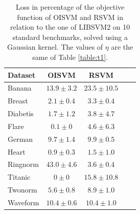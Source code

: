 \begin{table}
\caption{Loss in percentage of the objective function of OISVM and RSVM in relation to the one
 of LIBSVM2 on 10 standard benchmarks, solved using a Gaussian kernel. The values of $\eta$
 are the same of Table \ref{table:t1}.}
\label{table:t1_o}
\centering
\footnotesize
\begin{tabular}[!h]{lcccc}
\hline
    Dataset   & OISVM          & RSVM            \\ \hline
     Banana   & $13.9\pm3.2$ & $23.5\pm10.5$ \\
     Breast   & $2.1\pm0.4$  & $3.3\pm0.4$   \\
     Diabetis & $1.7\pm1.2$  & $3.8\pm4.7$   \\
     Flare    & $0.1\pm0$    & $4.6\pm6.3$   \\
     German   & $9.7\pm1.4$  & $9.9\pm0.5$   \\
     Heart    & $0.9\pm0.3$  & $1.5\pm1.0$   \\
     Ringnorm & $43.0\pm4.6$ & $3.6\pm0.4$   \\
     Titanic  & $0\pm0$      & $15.8\pm10.8$ \\
     Twonorm  & $5.6\pm0.8$  & $8.9\pm1.0$   \\
     Waveform & $10.4\pm0.6$ & $10.4\pm1.0$  \\ \hline
\end{tabular}
\end{table}

